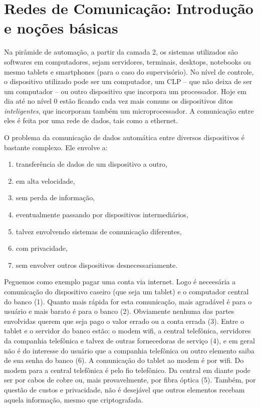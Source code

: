 \section{Redes de Comunicação: Introdução e noções básicas}
Na pirâmide de automação, a partir da camada 2, os sistemas utilizados são softwares em computadores, sejam servidores, terminais, desktops, notebooks ou mesmo tablets e smartphones (para o caso do supervisório). No nível de controle, o dispositivo utilizado pode ser um computador, um CLP -- que não deixa de ser um computador -- ou outro dispositivo que incorpora um processador. Hoje em dia até no nível 0 estão ficando cada vez mais comuns os dispositivos ditos \emph{inteligentes}, que incorporam também um microprocessador. A comunicação entre eles é feita por uma rede de dados, tais como a ethernet.

O problema da comunicação de dados automática entre diversos dispositivos é bastante complexo. Ele envolve a:
\begin{enumerate}
	\item transferência de dados de um dispositivo a outro,
	\item em alta velocidade,
	\item sem perda de informação,
	\item eventualmente passando por dispositivos intermediários,
	\item talvez envolvendo sistemas de comunicação diferentes,
	\item com privacidade,
	\item sem envolver outros dispositivos desnecessariamente.
\end{enumerate}

Peguemos como exemplo pagar uma conta via internet. Logo é neceesária a comunicação do dispositivo caseiro (que seja um tablet) e o computador central do banco (1). Quanto mais rápida for esta comunicação, mais agradável é para o usuário e mais barato é para o banco (2). Obviamente nenhuma das partes envolvidas querem que seja pago o valor errado ou a conta errada (3). Entre o tablet e o servidor do banco estão: o modem wifi, a central telefônica, servidores da companhia telefônica e talvez de outras fornecedoras de serviço (4), e em geral não é do interesse do usuário que a companhia telefônica ou outro elemento saiba de sua senha do banco (6). A comunicação do tablet ao modem é por wifi. Do modem para a central telefônica é pelo fio telefônico. Da central em diante pode ser por cabos de cobre ou, mais provavelmente, por fibra óptica (5). Também, por questão de custos e privacidade, não é desejável que outros elementos recebam aquela informação, mesmo que criptografada.

